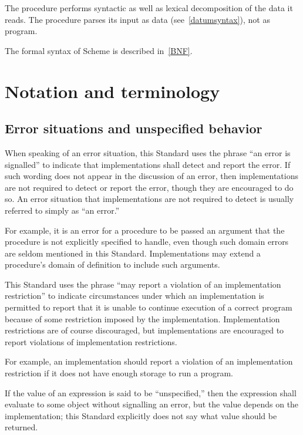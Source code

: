 The  procedure performs syntactic as well as lexical decomposition of
the data it reads.  The  procedure parses its input as data
(see~\ref{datumsyntax}), not as program.

The formal syntax of Scheme is described in~\ref{BNF}.


\section{Notation and terminology}


\subsection{Error situations and unspecified behavior}

When speaking of an error situation, this Standard uses the phrase ``an
error is signalled'' to indicate that implementations shall detect and
report the error.  If such wording does not appear in the discussion of
an error, then implementations are not required to detect or report the
error, though they are encouraged to do so.  An error situation that
implementations are not required to detect is usually referred to simply
as ``an error.''

\vest For example, it is an error for a procedure to be passed an argument that
the procedure is not explicitly specified to handle, even though such
domain errors are seldom mentioned in this Standard.  Implementations may
extend a procedure's domain of definition to include such arguments.

\vest This Standard uses the phrase ``may report a violation of an
implementation restriction'' to indicate circumstances under which an
implementation is permitted to report that it is unable to continue
execution of a correct program because of some restriction imposed by the
implementation.  Implementation restrictions are of course discouraged,
but implementations are encouraged to report violations of implementation
restrictions.

\vest For example, an implementation should report a violation of an
implementation restriction if it does not have enough storage to run a
program.

\vest If the value of an expression is said to be ``unspecified,'' then
the expression shall evaluate to some object without signalling an error,
but the value depends on the implementation; this Standard explicitly does
not say what value should be returned. 

